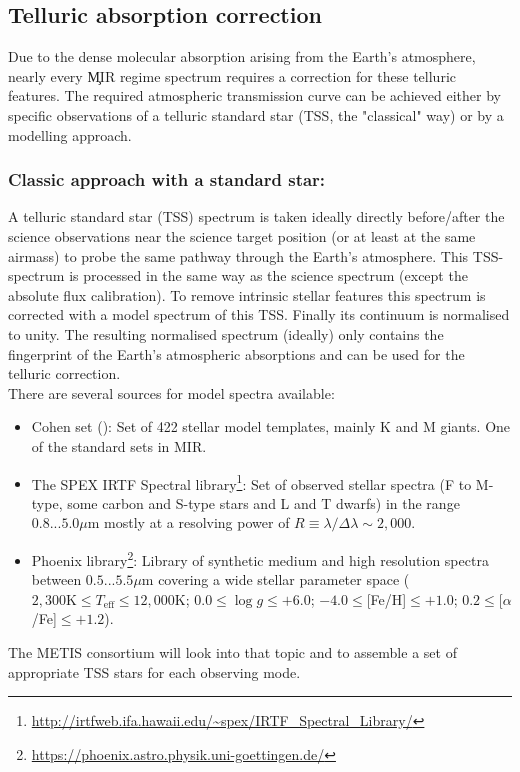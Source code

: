 
\subsection{Telluric absorption correction}\label{ssec:tellcorr}
Due to the dense molecular absorption arising from the Earth's atmosphere, nearly every \c{MIR} regime spectrum requires a correction for these telluric features. The required atmospheric transmission curve can be achieved either by specific observations of a telluric standard star (\ac{TSS}, the "classical" way) or by a modelling approach. \\
\subsubsection{Classic approach with a standard star:}
A telluric standard star (\ac{TSS}) spectrum is taken ideally directly before/after the science observations near the science target position (or at least at the same airmass) to probe the same pathway through the Earth's atmosphere. This \ac{TSS}-spectrum is processed in the same way as the science spectrum (except the absolute flux calibration). To remove intrinsic stellar features this spectrum is corrected with a model spectrum of this \ac{TSS}. Finally its continuum is normalised to unity. The resulting normalised spectrum (ideally) only contains the fingerprint of the Earth's atmospheric absorptions and can be used for the telluric correction.\\
There are several sources for model spectra available:
\begin{itemize}
    \item Cohen set (\cite{coh99}): Set of 422 stellar model templates, mainly K and M giants. One of the standard sets in \ac{MIR}.
    \item The SPEX \ac{IRTF} Spectral library\footnote{\url{http://irtfweb.ifa.hawaii.edu/~spex/IRTF_Spectral_Library/}}: Set of observed stellar spectra (F to M-type, some carbon and S-type stars and L and T dwarfs) in the range $0.8...5.0\mu$m mostly at a resolving power of $R\equiv\lambda/\Delta\lambda\sim2,000$.
    \item Phoenix library\footnote{\url{https://phoenix.astro.physik.uni-goettingen.de/}}\cite{phoenix}: Library of synthetic medium and high resolution spectra between $0.5...5.5\mu$m covering a wide stellar parameter space ($2,300\textrm{K}\leq T_\textrm{eff}\leq12,000\textrm{K}$; $0.0\leq\log g\leq+6.0$; $-4.0\leq$[Fe/H]$\leq+1.0$; $0.2\leq$[$\alpha$/Fe]$\leq+1.2$). \\
\end{itemize}
The \ac{METIS} consortium will look into that topic and to assemble a set of appropriate \ac{TSS} stars for each observing mode.
